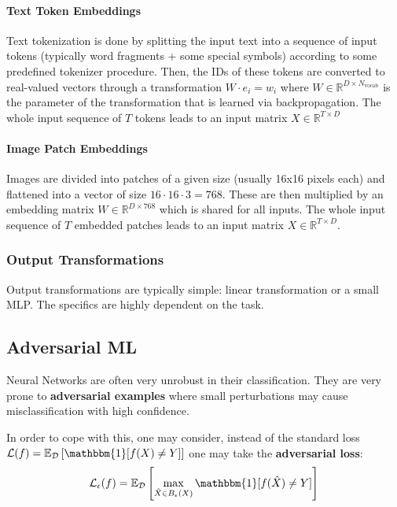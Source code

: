 \documentclass{article}
\newcommand{\R}{\mathbb{R}}
\newcommand{\E}{\mathbb{E}}
\newcommand{\ind}{\mathbbm{1}}
\newcommand{\loss}{\mathcal{L}}
\newcommand{\dist}{\mathcal{D}}
\begin{document}
\paragraph{Text Token Embeddings}

Text tokenization is done by splitting the input text into a sequence of input tokens (typically word fragments + some special symbols) according to some predefined tokenizer procedure.
Then, the IDs of these tokens are converted to real-valued vectors through a transformation $W \cdot e_i = w_i$ where $W \in \R^{D \times N_\text{vocab}}$ is the parameter of the transformation that is learned via backpropagation.
The whole input sequence of $T$ tokens leads to an input matrix $X \in \R^{T \times D}$

\paragraph{Image Patch Embeddings}

Images are divided into patches of a given size (usually 16x16 pixels each) and flattened into a vector of size $16 \cdot 16 \cdot 3 = 768$.
These are then multiplied by an embedding matrix $W \in \R^{D \times 768}$ which is shared for all inputs.
The whole input sequence of $T$ embedded patches leads to an input matrix $X \in \R^{T \times D}$.

\subsubsection{Output Transformations}

Output transformations are typically simple: linear transformation or a small MLP.
The specifics are highly dependent on the task.

\subsection{Adversarial ML}

Neural Networks are often very unrobust in their classification.
They are very prone to \textbf{adversarial examples} where small perturbations may cause misclassification with high confidence.

In order to cope with this, one may consider, instead of the standard loss $\loss(f) = \E_\dist \left[ \ind[f(X) \neq Y]\right]$ one may take the \textbf{adversarial loss}:
$$
\loss_\epsilon(f) = 
\E_\dist \left[ \max_{\hat{X} \in B_\epsilon(X)} \ind[ f(\hat{X}) \neq Y] \right] 
$$
\end{document}
